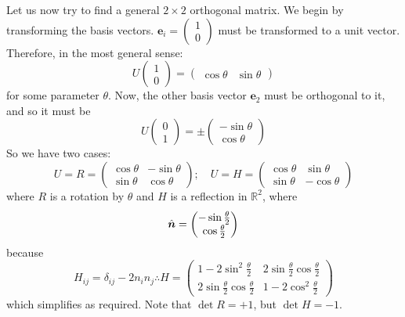 \documentclass{article}
\begin{document}
Let us now try to find a general $2 \times 2$ orthogonal matrix. We begin by transforming the basis vectors. $\bm e_i = \begin{pmatrix} 1 \\ 0 \end{pmatrix}$ must be transformed to a unit vector. Therefore, in the most general sense:
\[ U \begin{pmatrix}
		1 \\0
	\end{pmatrix} = \begin{pmatrix}
		\cos \theta & \sin \theta
	\end{pmatrix} \]
for some parameter $\theta$. Now, the other basis vector $\bm e_2$ must be orthogonal to it, and so it must be
\[
	U \begin{pmatrix}
		0 \\ 1
	\end{pmatrix} = \pm\begin{pmatrix}
		-\sin \theta \\
		\cos \theta
	\end{pmatrix}
\]
So we have two cases:
\[ U = R = \begin{pmatrix}
		\cos \theta & -\sin\theta \\ \sin \theta & \cos \theta
	\end{pmatrix};\quad U = H = \begin{pmatrix}
		\cos \theta & \sin \theta \\ \sin \theta & -\cos \theta
	\end{pmatrix} \]
where $R$ is a rotation by $\theta$ and $H$ is a reflection in $\mathbb R^2$, where
\[ \hat{\bm n} = \begin{pmatrix}
		-\sin \frac{\theta}{2} \\ \cos \frac{\theta}{2}
	\end{pmatrix} \]
because
\[ H_{ij} = \delta_{ij} - 2n_in_j \therefore H = \begin{pmatrix}
		1 - 2 \sin^2 \frac{\theta}{2}              & 2\sin\frac{\theta}{2}\cos\frac{\theta}{2} \\
		2\sin\frac{\theta}{2} \cos\frac{\theta}{2} & 1-2\cos^2\frac{\theta}{2}
	\end{pmatrix} \]
which simplifies as required. Note that $\det R = +1$, but $\det H = -1$.
\end{document}
